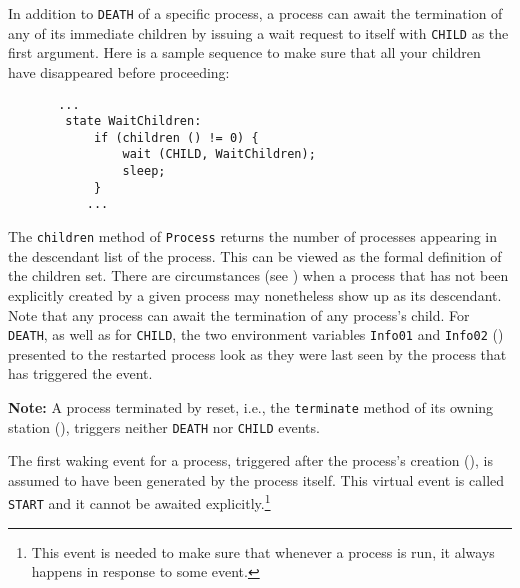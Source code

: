 In addition to {\tt DEATH} of a specific process, a process can await the
termination of any of its immediate children by issuing a wait request to
itself with {\tt CHILD} as the first argument.
Here is a sample sequence to make sure that all your children have disappeared
before proceeding:
\begin{verbatim}
       ...
        state WaitChildren:
            if (children () != 0) {
                wait (CHILD, WaitChildren);
                sleep;
            }
           ...
\end{verbatim}
The {\tt children} method of {\tt Process} returns the number of
processes appearing in the descendant list of the process.
This can be viewed as the formal definition of the children set.
There are circumstances (see ) when a process
that has not been explicitly created by a given process may nonetheless
show up as its descendant.
Note that any process can await the termination of any process's child.
For {\tt DEATH}, as well as for {\tt CHILD}, the two environment variables
{\tt Info01} and {\tt Info02} () presented to the restarted
process look as they were last seen by the process that has
triggered the event.

\medskip

\noindent
{\bf Note:}
A process terminated by reset, i.e., the {\tt terminate} method of its
owning station (), triggers neither {\tt DEATH} nor
{\tt CHILD} events.

\medskip

The first waking event for a process, triggered after the process's creation
(), is assumed to have been generated by the process itself.
This virtual event is called {\tt START} and it cannot be awaited
explicitly.\footnote{This event is needed to make sure that whenever a process
is run, it always happens in response to some event.}


